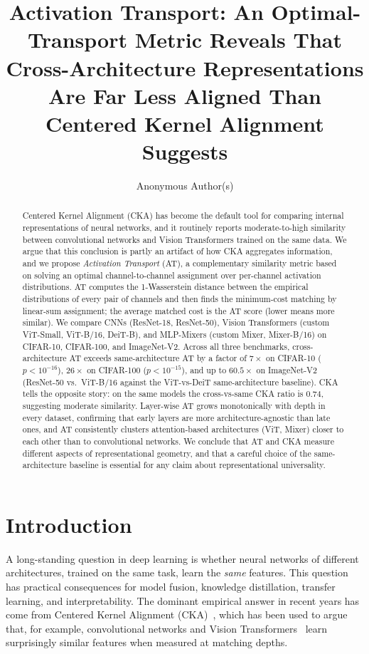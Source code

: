 \documentclass[11pt]{article}
\title{Activation Transport: An Optimal-Transport Metric Reveals That
Cross-Architecture Representations Are Far Less Aligned Than Centered
Kernel Alignment Suggests}
\author{Anonymous Author(s)}
\affil{Anonymous Affiliation}
\date{}
\begin{document}
\maketitle

\begin{abstract}
Centered Kernel Alignment (CKA) has become the default tool for comparing
internal representations of neural networks, and it routinely reports
moderate-to-high similarity between convolutional networks and Vision
Transformers trained on the same data. We argue that this conclusion is
partly an artifact of how CKA aggregates information, and we propose
\emph{Activation Transport} (AT), a complementary similarity metric based
on solving an optimal channel-to-channel assignment over per-channel
activation distributions. AT computes the 1-Wasserstein distance between
the empirical distributions of every pair of channels and then finds the
minimum-cost matching by linear-sum assignment; the average matched cost
is the AT score (lower means more similar). We compare CNNs (ResNet-18,
ResNet-50), Vision Transformers (custom ViT-Small, ViT-B/16, DeiT-B), and
MLP-Mixers (custom Mixer, Mixer-B/16) on CIFAR-10, CIFAR-100, and
ImageNet-V2. Across all three benchmarks, cross-architecture AT exceeds
same-architecture AT by a factor of $7\times$ on CIFAR-10
($p<10^{-16}$), $26\times$ on CIFAR-100 ($p<10^{-15}$), and up to
$60.5\times$ on ImageNet-V2 (ResNet-50 vs.\ ViT-B/16 against the
ViT-vs-DeiT same-architecture baseline). CKA tells the opposite story:
on the same models the cross-vs-same CKA ratio is $0.74$, suggesting
moderate similarity. Layer-wise AT grows monotonically with depth in
every dataset, confirming that early layers are more architecture-agnostic
than late ones, and AT consistently clusters attention-based
architectures (ViT, Mixer) closer to each other than to convolutional
networks. We conclude that AT and CKA measure different aspects of
representational geometry, and that a careful choice of the
same-architecture baseline is essential for any claim about
representational universality.
\end{abstract}

\section{Introduction}

A long-standing question in deep learning is whether neural networks
of different architectures, trained on the same task, learn the
\emph{same} features. This question has practical consequences for
model fusion, knowledge distillation, transfer learning, and
interpretability. The dominant empirical answer in recent years has
come from Centered Kernel Alignment (CKA)~\cite{kornblith2019similarity},
which has been used to argue that, for example, convolutional networks
and Vision Transformers~\cite{dosovitskiy2021vit} learn surprisingly
similar features when measured at matching depths.
\end{document}
